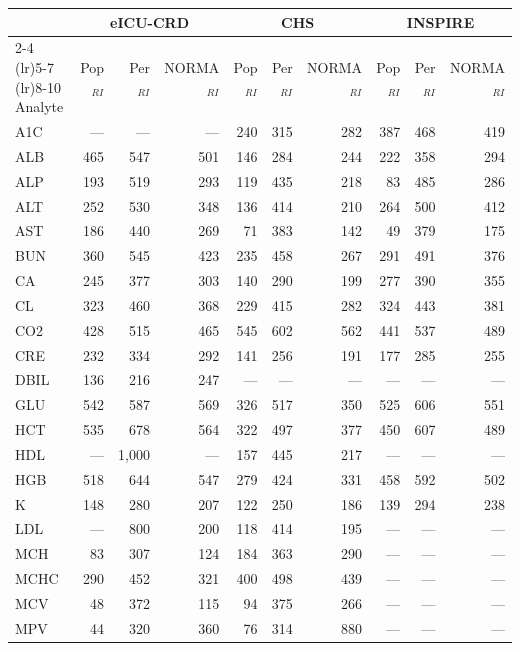 \begin{table}[ht]
\centering
\footnotesize
\begin{tabular}{lrrrrrrrrr}
\toprule
 & \multicolumn{3}{c}{eICU-CRD} & \multicolumn{3}{c}{CHS} & \multicolumn{3}{c}{INSPIRE} \\
\cmidrule(lr){2-4} \cmidrule(lr){5-7} \cmidrule(lr){8-10}
Analyte & Pop$_{RI}$ & Per$_{RI}$ & NORMA$_{RI}$ & Pop$_{RI}$ & Per$_{RI}$ & NORMA$_{RI}$ & Pop$_{RI}$ & Per$_{RI}$ & NORMA$_{RI}$ \\
\midrule
A1C & --- & --- & --- & 240 & 315 & 282 & 387 & 468 & 419 \\
ALB & 465 & 547 & 501 & 146 & 284 & 244 & 222 & 358 & 294 \\
ALP & 193 & 519 & 293 & 119 & 435 & 218 & 83 & 485 & 286 \\
ALT & 252 & 530 & 348 & 136 & 414 & 210 & 264 & 500 & 412 \\
AST & 186 & 440 & 269 & 71 & 383 & 142 & 49 & 379 & 175 \\
BUN & 360 & 545 & 423 & 235 & 458 & 267 & 291 & 491 & 376 \\
CA & 245 & 377 & 303 & 140 & 290 & 199 & 277 & 390 & 355 \\
CL & 323 & 460 & 368 & 229 & 415 & 282 & 324 & 443 & 381 \\
CO2 & 428 & 515 & 465 & 545 & 602 & 562 & 441 & 537 & 489 \\
CRE & 232 & 334 & 292 & 141 & 256 & 191 & 177 & 285 & 255 \\
DBIL & 136 & 216 & 247 & --- & --- & --- & --- & --- & --- \\
GLU & 542 & 587 & 569 & 326 & 517 & 350 & 525 & 606 & 551 \\
HCT & 535 & 678 & 564 & 322 & 497 & 377 & 450 & 607 & 489 \\
HDL & --- & 1,000 & --- & 157 & 445 & 217 & --- & --- & --- \\
HGB & 518 & 644 & 547 & 279 & 424 & 331 & 458 & 592 & 502 \\
K & 148 & 280 & 207 & 122 & 250 & 186 & 139 & 294 & 238 \\
LDL & --- & 800 & 200 & 118 & 414 & 195 & --- & --- & --- \\
MCH & 83 & 307 & 124 & 184 & 363 & 290 & --- & --- & --- \\
MCHC & 290 & 452 & 321 & 400 & 498 & 439 & --- & --- & --- \\
MCV & 48 & 372 & 115 & 94 & 375 & 266 & --- & --- & --- \\
MPV & 44 & 320 & 360 & 76 & 314 & 880 & --- & --- & --- \\

\end{tabular}
\end{table}
